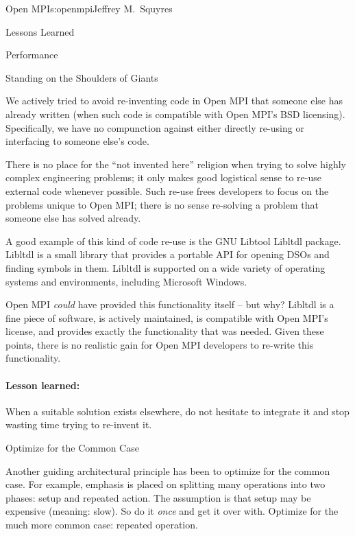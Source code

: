 \begin{aosachapter}{Open MPI}{s:openmpi}{Jeffrey M.\ Squyres}
\begin{aosasect1}{Lessons Learned}
\begin{aosasect2}{Performance}
\end{aosasect2}


\begin{aosasect2}{Standing on the Shoulders of Giants}

We actively tried to avoid re-inventing code in Open MPI that someone
else has already written (when such code is compatible with Open
MPI's BSD licensing).
%
Specifically, we have no compunction against either directly re-using
or interfacing to someone else's code.

There is no place for the ``not invented here'' religion when trying
to solve highly complex engineering problems; it only makes good
logistical sense to re-use external code whenever possible.
%
Such re-use frees developers to focus on the problems unique to Open
MPI; there is no sense re-solving a problem that someone else has
solved already.

A good example of this kind of code re-use is the GNU Libtool Libltdl
package.  Libltdl is a small library that provides a portable API for
opening DSOs and finding symbols in them.  Libltdl is supported on a
wide variety of operating systems and environments, including
Microsoft Windows.

Open MPI {\em could} have provided this functionality itself -- but
why?
%
Libltdl is a fine piece of software, is actively maintained, is
compatible with Open MPI's license, and provides exactly the
functionality that was needed.
%
Given these points, there is no realistic gain for Open MPI developers
to re-write this functionality.


\paragraph{Lesson learned:} 

When a suitable solution exists elsewhere, do not hesitate to integrate
it and stop wasting time trying to re-invent it.

\end{aosasect2}


\begin{aosasect2}{Optimize for the Common Case}

Another guiding architectural principle has been to optimize for the
common case.  
% 
For example, emphasis is placed on splitting many operations into two
phases: setup and repeated action.  The assumption is that setup may
be expensive (meaning: slow).  So do it {\em once} and get it over
with.
%
Optimize for the much more common case: repeated operation.


\end{aosasect2}
\end{aosasect1}
\end{aosachapter}
